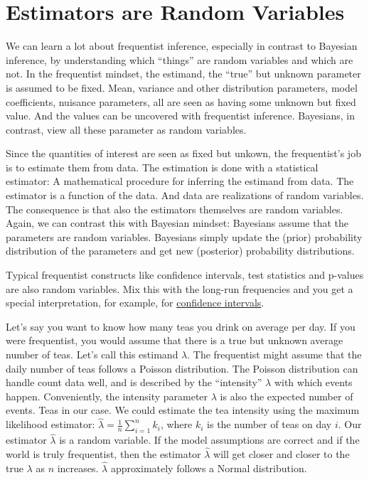 \documentclass[
  10pt,
]{scrbook}
\begin{document}
\hypertarget{estimators-are-random-variables}{%
\section{Estimators are Random Variables}\label{estimators-are-random-variables}}

We can learn a lot about frequentist inference, especially in contrast to Bayesian inference, by understanding which ``things'' are random variables and which are not.
In the frequentist mindset, the estimand, the ``true'' but unknown parameter is assumed to be fixed.
Mean, variance and other distribution parameters, model coefficients, nuisance parameters, all are seen as having some unknown but fixed value.
And the values can be uncovered with frequentist inference.
Bayesians, in contrast, view all these parameter as random variables.

Since the quantities of interest are seen as fixed but unkown, the frequentist's job is to estimate them from data.
The estimation is done with a statistical estimator: A mathematical procedure for inferring the estimand from data.
The estimator is a function of the data.
And data are realizations of random variables.
The consequence is that also the estimators themselves are random variables.
Again, we can contrast this with Bayesian mindset:
Bayesians assume that the parameters are random variables.
Bayesians simply update the (prior) probability distribution of the parameters and get new (posterior) probability distributions.

Typical frequentist constructs like confidence intervals, test statistics and p-values are also random variables.
Mix this with the long-run frequencies and you get a special interpretation, for example, for \protect\hyperlink{confidence-intervals}{confidence intervals}.

Let's say you want to know how many teas you drink on average per day.
If you were frequentist, you would assume that there is a true but unknown average number of teas.
Let's call this estimand \(\lambda\).
The frequentist might assume that the daily number of teas follows a Poisson distribution.
The Poisson distribution can handle count data well, and is described by the ``intensity'' \(\lambda\) with which events happen.
Conveniently, the intensity parameter \(\lambda\) is also the expected number of events.
Teas in our case.
We could estimate the tea intensity using the maximum likelihood estimator: \(\hat{\lambda}= \frac{1}{n} \sum_{i=1}^n k_i\), where \(k_i\) is the number of teas on day \(i\).
Our estimator \(\hat{\lambda}\) is a random variable.
If the model assumptions are correct and if the world is truly frequentist, then the estimator \(\hat{\lambda}\) will get closer and closer to the true \(\lambda\) as \(n\) increases.
\(\hat{\lambda}\) approximately follows a Normal distribution.
\end{document}
